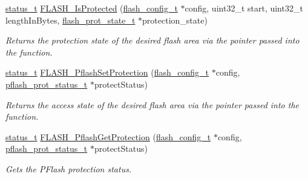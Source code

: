 \begin{DoxyCompactItemize}
\item 
\mbox{\hyperlink{group__ksdk__common_gaaabdaf7ee58ca7269bd4bf24efcde092}{status\+\_\+t}} \mbox{\hyperlink{group__ftfx__flash__driver_ga4f1b4e210550b428cfabe4f7e2a308bd}{F\+L\+A\+S\+H\+\_\+\+Is\+Protected}} (\mbox{\hyperlink{group__ftfx__flash__driver_ga0dfc969e6f9e17c17e60d823565141a5}{flash\+\_\+config\+\_\+t}} $\ast$config, uint32\+\_\+t start, uint32\+\_\+t length\+In\+Bytes, \mbox{\hyperlink{group__ftfx__flash__driver_ga803f9a1815977c4e0a9a9e3f37e069c4}{flash\+\_\+prot\+\_\+state\+\_\+t}} $\ast$protection\+\_\+state)
\begin{DoxyCompactList}\small\item\em Returns the protection state of the desired flash area via the pointer passed into the function. \end{DoxyCompactList}\item 
\mbox{\hyperlink{group__ksdk__common_gaaabdaf7ee58ca7269bd4bf24efcde092}{status\+\_\+t}} \mbox{\hyperlink{group__ftfx__flash__driver_ga3787c4615628bef82ffe5db4c7847f30}{F\+L\+A\+S\+H\+\_\+\+Pflash\+Set\+Protection}} (\mbox{\hyperlink{group__ftfx__flash__driver_ga0dfc969e6f9e17c17e60d823565141a5}{flash\+\_\+config\+\_\+t}} $\ast$config, \mbox{\hyperlink{group__ftfx__flash__driver_ga8442f40cafd588044b2b4c00ec2661ed}{pflash\+\_\+prot\+\_\+status\+\_\+t}} $\ast$protect\+Status)
\begin{DoxyCompactList}\small\item\em Returns the access state of the desired flash area via the pointer passed into the function. \end{DoxyCompactList}\item 
\mbox{\hyperlink{group__ksdk__common_gaaabdaf7ee58ca7269bd4bf24efcde092}{status\+\_\+t}} \mbox{\hyperlink{group__ftfx__flash__driver_ga453bc5291e0b3d4d68a316366d2693aa}{F\+L\+A\+S\+H\+\_\+\+Pflash\+Get\+Protection}} (\mbox{\hyperlink{group__ftfx__flash__driver_ga0dfc969e6f9e17c17e60d823565141a5}{flash\+\_\+config\+\_\+t}} $\ast$config, \mbox{\hyperlink{group__ftfx__flash__driver_ga8442f40cafd588044b2b4c00ec2661ed}{pflash\+\_\+prot\+\_\+status\+\_\+t}} $\ast$protect\+Status)
\begin{DoxyCompactList}\small\item\em Gets the P\+Flash protection status. \end{DoxyCompactList}\end{DoxyCompactItemize}
